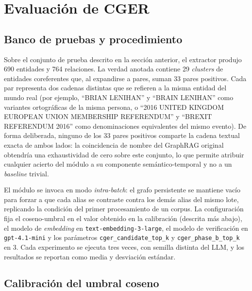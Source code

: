 \section{Evaluación de CGER}\label{sec:eval-cger}

\subsection{Banco de pruebas y procedimiento}

Sobre el conjunto de prueba descrito en la sección anterior, el extractor produjo 690 entidades y 764 relaciones. La verdad anotada contiene 29 \emph{clusters} de entidades coreferentes que, al expandirse a pares, suman 33 pares positivos. Cada par representa dos cadenas distintas que se refieren a la misma entidad del mundo real (por ejemplo, ``BRIAN LENIHAN'' y ``BRAIN LENIHAN'' como variantes ortográficas de la misma persona, o ``2016 UNITED KINGDOM EUROPEAN UNION MEMBERSHIP REFERENDUM'' y ``BREXIT REFERENDUM 2016'' como denominaciones equivalentes del mismo evento). De forma deliberada, ninguno de los 33 pares positivos comparte la cadena textual exacta de ambos lados: la coincidencia de nombre del GraphRAG original obtendría una exhaustividad de cero sobre este conjunto, lo que permite atribuir cualquier acierto del módulo a su componente semántico-temporal y no a un \emph{baseline} trivial.

El módulo se invoca en modo \emph{intra-batch}: el grafo persistente se mantiene vacío para forzar a que cada alias se contraste contra los demás alias del mismo lote, replicando la condición del primer procesamiento de un corpus. La configuración fija el coseno-umbral en el valor obtenido en la calibración (descrita más abajo), el modelo de \emph{embedding} en \texttt{text-embedding-3-large}, el modelo de verificación en \texttt{gpt-4.1-mini} y los parámetros \texttt{cger\_candidate\_top\_k} y \texttt{cger\_phase\_b\_top\_k} en 3. Cada experimento se ejecuta tres veces, con semilla distinta del LLM, y los resultados se reportan como media y desviación estándar.

\subsection{Calibración del umbral coseno}

